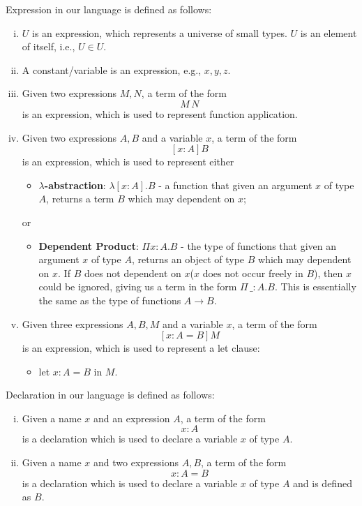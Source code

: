 Expression in our language is defined as follows:
\begin{definition}[Expression]\label{theory:def:exp}
  \leavevmode \vspace{-\baselineskip}
  \begin{enumerate}[(i)]
    \item $U$ is an expression, which represents a universe of small types. $U$ is an element of itself, i.e., $U \in U$.
    \item A constant/variable is an expression, e.g., $x, y, z$. 
    \item Given two expressions $M, N$, a term of the form
      \[ M\,N \]
      is an expression, which is used to represent function application.
    \item Given two expressions $A, B$ and a variable $x$, a term of the form
      \[ [x : A] B \]
      is an expression, which is used to represent either
      \begin{itemize}
        \item \textbf{$\lambda$-abstraction}: $\lambda[x : A].B$ - a function that given an argument $x$ of type $A$, returns a term $B$ which may dependent on $x$;
      \end{itemize}
      or
      \begin{itemize}
        \item \textbf{Dependent Product}: $\Pi x : A.B$ - the type of functions that given an argument $x$ of type $A$, returns an object of type $B$ which may dependent on $x$. If $B$ does not dependent on $x$($x$ does not occur freely in $B$), then $x$ could be ignored, giving us a term in the form  $\Pi \,\_ : A.B$. This is essentially the same as the type of functions $A \to B$.
      \end{itemize}
    \item Given three expressions $A,B,M$ and a variable $x$, a term of the form
      \[ [x : A = B] M \]
      is an expression, which is used to represent a let clause:
      \begin{itemize}
        \item let $x : A = B$ in $M$.
      \end{itemize}
  \end{enumerate}
\end{definition}

Declaration in our language is defined as follows:
\begin{definition}[Declaration]\label{theory:def:decl}
  \leavevmode \vspace{-\baselineskip}
  \begin{enumerate}[(i)]
  \item Given a name $x$ and an expression $A$, a term of the form
    \[x : A\]
    is a declaration which is used to declare a variable $x$ of type $A$.
  \item Given a name $x$ and two expressions $A,B$, a term of the form
    \[x : A = B\]
    is a declaration which is used to declare a variable $x$ of type $A$ and is defined as $B$.
  \end{enumerate}
\end{definition}

